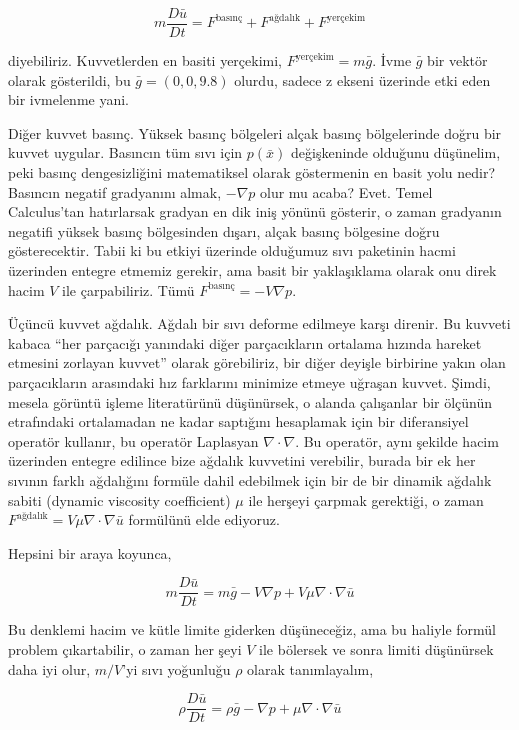 \documentclass[12pt,fleqn]{article}\usepackage{../../common}
\begin{document}
$$
m \frac{D \bar{u}}{D t} = F^{\textrm{basınç}} + F^{\textrm{ağdalık}} + F^{\textrm{yerçekim}} 
$$

diyebiliriz. Kuvvetlerden en basiti yerçekimi, $F^{\textrm{yerçekim}} = m
\bar{g}$. İvme $\bar{g}$ bir vektör olarak gösterildi, bu $\bar{g} = (0, 0,
9.8)$ olurdu, sadece z ekseni üzerinde etki eden bir ivmelenme yani.

Diğer kuvvet basınç. Yüksek basınç bölgeleri alçak basınç bölgelerinde doğru bir
kuvvet uygular. Basıncın tüm sıvı için $p(\bar{x})$ değişkeninde olduğunu
düşünelim, peki basınç dengesizliğini matematiksel olarak göstermenin en basit
yolu nedir? Basıncın negatif gradyanını almak, $-\nabla p$ olur mu acaba?
Evet. Temel Calculus'tan hatırlarsak gradyan en dik iniş yönünü gösterir, o
zaman gradyanın negatifi yüksek basınç bölgesinden dışarı, alçak basınç
bölgesine doğru gösterecektir. Tabii ki bu etkiyi üzerinde olduğumuz sıvı
paketinin hacmi üzerinden entegre etmemiz gerekir, ama basit bir yaklaşıklama
olarak onu direk hacim $V$ ile çarpabiliriz. Tümü $F^{\textrm{basınç}} = - V
\nabla p$.

Üçüncü kuvvet ağdalık. Ağdalı bir sıvı deforme edilmeye karşı direnir. Bu
kuvveti kabaca ``her parçacığı yanındaki diğer parçacıkların ortalama hızında
hareket etmesini zorlayan kuvvet'' olarak görebiliriz, bir diğer deyişle
birbirine yakın olan parçacıkların arasındaki hız farklarını minimize etmeye
uğraşan kuvvet. Şimdi, mesela görüntü işleme literatürünü düşünürsek, o alanda
çalışanlar bir ölçünün etrafındaki ortalamadan ne kadar saptığını hesaplamak
için bir diferansiyel operatör kullanır, bu operatör Laplasyan $\nabla \cdot
\nabla$.  Bu operatör, aynı şekilde hacim üzerinden entegre edilince bize
ağdalık kuvvetini verebilir, burada bir ek her sıvının farklı ağdalığını formüle
dahil edebilmek için bir de bir dinamik ağdalık sabiti (dynamic viscosity
coefficient) $\mu$ ile herşeyi çarpmak gerektiği, o zaman $F^{\textrm{ağdalık}}
= V \mu \nabla \cdot \nabla \bar{u}$ formülünü elde ediyoruz.

Hepsini bir araya koyunca,

$$
m \frac{D \bar{u}}{D t} = m\bar{g} - V \nabla p + V \mu \nabla \cdot \nabla \bar{u}
$$

Bu denklemi hacim ve kütle limite giderken düşüneceğiz, ama bu haliyle formül
problem çıkartabilir, o zaman her şeyi $V$ ile bölersek ve sonra limiti
düşünürsek daha iyi olur, $m/V$'yi sıvı yoğunluğu $\rho$ olarak tanımlayalım,

$$
\rho \frac{D \bar{u}}{D t} = \rho \bar{g} -
\nabla p +
\mu \nabla \cdot \nabla \bar{u}
$$
\end{document}
